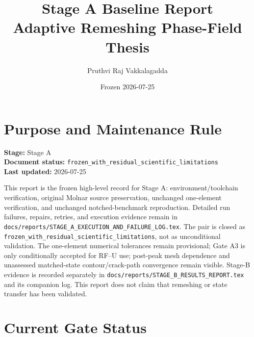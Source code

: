 \documentclass[11pt,a4paper]{article}
\title{Stage A Baseline Report\\Adaptive Remeshing Phase-Field Thesis}
\author{Pruthvi Raj Vakkalagadda}
\date{Frozen 2026-07-25}
\begin{document}
\maketitle

\section*{Purpose and Maintenance Rule}

\noindent\textbf{Stage:} Stage A\\
\textbf{Document status:} \texttt{frozen\_with\_residual\_scientific\_limitations}\\
\textbf{Last updated:} 2026-07-25

\medskip

This report is the frozen high-level record for Stage A: environment/toolchain
verification, original Molnar source preservation, unchanged one-element
verification, and unchanged notched-benchmark reproduction. Detailed run
failures, repairs, retries, and execution evidence remain in
\texttt{docs/reports/STAGE\_A\_EXECUTION\_AND\_FAILURE\_LOG.tex}. The pair is
closed as \texttt{frozen\_with\_residual\_scientific\_limitations}, not as
unconditional validation. The one-element numerical tolerances remain
provisional; Gate A3 is only conditionally accepted for RF--U use; post-peak
mesh dependence and unassessed matched-state contour/crack-path convergence
remain visible. Stage-B evidence is recorded separately in
\texttt{docs/reports/STAGE\_B\_RESULTS\_REPORT.tex} and its companion log.
This report does not claim that remeshing or state transfer has been validated.

\section*{Current Gate Status}
\end{document}
